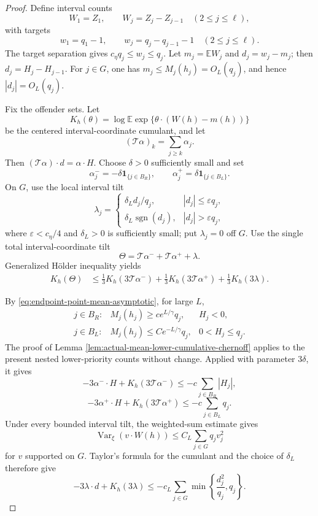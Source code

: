 \documentclass[11pt]{article}
\theoremstyle{remark}
\newcommand{\Ee}{\mathbb E}
\newcommand{\one}{\mathbf 1}
\newcommand{\Var}{\operatorname{Var}}
\begin{document}
\begin{proof}
Define interval counts
\[
        W_1=Z_1,\qquad W_j=Z_j-Z_{j-1}\quad(2\le j\le\ell),
\]
with targets
\[
        w_1=q_1-1,\qquad
        w_j=q_j-q_{j-1}-1\quad(2\le j\le\ell).
\]
The target separation gives $c_\eta q_j\le w_j\le q_j$.  Let
$m_j=\Ee W_j$ and $d_j=w_j-m_j$; then $d_j=H_j-H_{j-1}$.
For $j\in G$, one has $m_j\le M_j(h_j)=O_L(q_j)$, and hence
$|d_j|=O_L(q_j)$.

Fix the offender sets.  Let
\[
        K_h(\theta)=\log\Ee
        \exp\{\theta\cdot(W(h)-m(h))\}
\]
be the centered interval-coordinate cumulant, and let
\[
        (\mathcal T\alpha)_k=\sum_{j\ge k}\alpha_j.
\]
Then
$(\mathcal T\alpha)\cdot d=\alpha\cdot H$.
Choose $\delta>0$ sufficiently small and set
\[
        \alpha_j^-=-\delta\one_{\{j\in B_R\}},
        \qquad
        \alpha_j^+=\delta\one_{\{j\in B_L\}}.
\]
On $G$, use the local interval tilt
\[
        \lambda_j=
        \begin{cases}
        \delta_Ld_j/q_j,& |d_j|\le\varepsilon q_j,\\
        \delta_L\operatorname{sgn}(d_j),& |d_j|>\varepsilon q_j,
        \end{cases}
\]
where $\varepsilon<c_\eta/4$ and $\delta_L>0$ is sufficiently small; put
$\lambda_j=0$ off $G$.  Use the single total interval-coordinate tilt
\[
        \Theta=\mathcal T\alpha^-+\mathcal T\alpha^++\lambda.
\tag{10.19}\label{eq:endpoint-point-total-tilt}
\]
Generalized H\"older inequality yields
\[
\begin{aligned}
K_h(\Theta)
&\le\frac13K_h(3\mathcal T\alpha^-)
 +\frac13K_h(3\mathcal T\alpha^+)
 +\frac13K_h(3\lambda).
\end{aligned}
\tag{10.20}\label{eq:endpoint-point-holder}
\]

By \eqref{eq:endpoint-point-mean-asymptotic}, for large $L$,
\[
\begin{array}{lll}
 j\in B_R:&M_j(h_j)\ge ce^{L/\gamma}q_j,&H_j<0,\\[1mm]
 j\in B_L:&M_j(h_j)\le Ce^{-L/\gamma}q_j,&0<H_j\le q_j.
\end{array}
\tag{10.21}\label{eq:endpoint-point-offender-geometry}
\]
The proof of Lemma
\ref{lem:actual-mean-lower-cumulative-chernoff} applies to the present nested
lower-priority counts without change.  Applied with parameter $3\delta$, it
gives
\[
        -3\alpha^-\cdot H+K_h(3\mathcal T\alpha^-)
        \le-c\sum_{j\in B_R}|H_j|,
\tag{10.22}\label{eq:endpoint-point-right-cost}
\]
\[
        -3\alpha^+\cdot H+K_h(3\mathcal T\alpha^+)
        \le-c\sum_{j\in B_L}q_j.
\tag{10.23}\label{eq:endpoint-point-left-cost}
\]
Under every bounded interval tilt, the weighted-sum estimate gives
\[
        \Var_\xi(v\cdot W(h))\le C_L\sum_{j\in G}q_jv_j^2
\]
for $v$ supported on $G$.  Taylor's formula for the cumulant and the choice of
$\delta_L$ therefore give
\[
        -3\lambda\cdot d+K_h(3\lambda)
        \le-c_L\sum_{j\in G}
        \min\left\{\frac{d_j^2}{q_j},q_j\right\}.
\tag{10.24}\label{eq:endpoint-point-local-cost}
\]


\end{proof}
\end{document}

